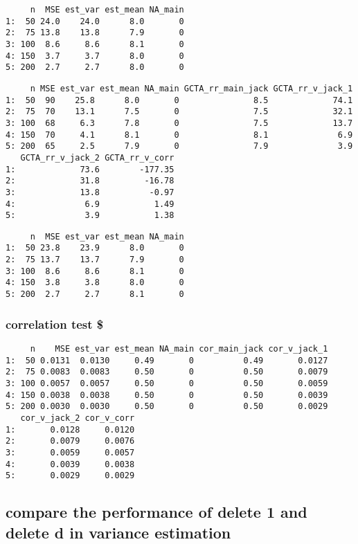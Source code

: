 \documentclass[]{article}
\begin{document}
\begin{verbatim}
     n  MSE est_var est_mean NA_main
1:  50 24.0    24.0      8.0       0
2:  75 13.8    13.8      7.9       0
3: 100  8.6     8.6      8.1       0
4: 150  3.7     3.7      8.0       0
5: 200  2.7     2.7      8.0       0
\end{verbatim}

\begin{verbatim}
     n MSE est_var est_mean NA_main GCTA_rr_main_jack GCTA_rr_v_jack_1
1:  50  90    25.8      8.0       0               8.5             74.1
2:  75  70    13.1      7.5       0               7.5             32.1
3: 100  68     6.3      7.8       0               7.5             13.7
4: 150  70     4.1      8.1       0               8.1              6.9
5: 200  65     2.5      7.9       0               7.9              3.9
   GCTA_rr_v_jack_2 GCTA_rr_v_corr
1:             73.6        -177.35
2:             31.8         -16.78
3:             13.8          -0.97
4:              6.9           1.49
5:              3.9           1.38
\end{verbatim}

\begin{verbatim}
     n  MSE est_var est_mean NA_main
1:  50 23.8    23.9      8.0       0
2:  75 13.7    13.7      7.9       0
3: 100  8.6     8.6      8.1       0
4: 150  3.8     3.8      8.0       0
5: 200  2.7     2.7      8.1       0
\end{verbatim}

\subsubsection{correlation test \$}\label{correlation-test}

\begin{verbatim}
     n    MSE est_var est_mean NA_main cor_main_jack cor_v_jack_1
1:  50 0.0131  0.0130     0.49       0          0.49       0.0127
2:  75 0.0083  0.0083     0.50       0          0.50       0.0079
3: 100 0.0057  0.0057     0.50       0          0.50       0.0059
4: 150 0.0038  0.0038     0.50       0          0.50       0.0039
5: 200 0.0030  0.0030     0.50       0          0.50       0.0029
   cor_v_jack_2 cor_v_corr
1:       0.0128     0.0120
2:       0.0079     0.0076
3:       0.0059     0.0057
4:       0.0039     0.0038
5:       0.0029     0.0029
\end{verbatim}

\subsection{compare the performance of delete 1 and delete d in variance
estimation}\label{compare-the-performance-of-delete-1-and-delete-d-in-variance-estimation}
\end{document}
